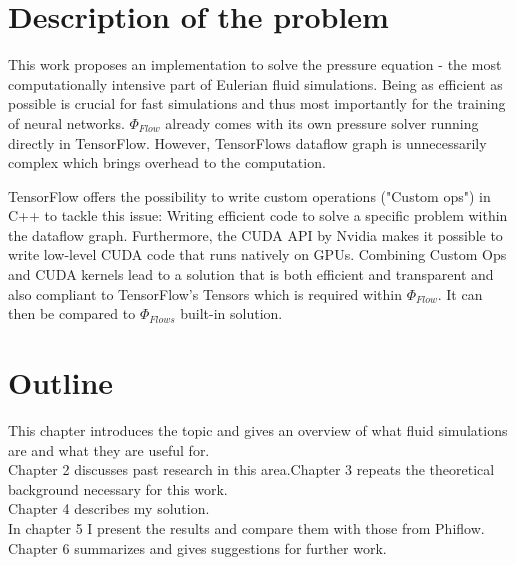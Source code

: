 \section{Description of the problem}
This work proposes an implementation to solve the pressure equation - the most computationally intensive part of Eulerian fluid simulations. Being as efficient as possible is crucial for fast simulations and thus most importantly for the training of neural networks. $\Phi_\textit{Flow}$ already comes with its own pressure solver running directly in TensorFlow. However, TensorFlows dataflow graph is unnecessarily complex which brings overhead to the computation.
\par TensorFlow offers the possibility to write custom operations ("Custom ops") in C++ to tackle this issue: Writing efficient code to solve a specific problem within the dataflow graph. Furthermore, the CUDA API by Nvidia makes it possible to write low-level CUDA code that runs natively on GPUs. Combining Custom Ops and CUDA kernels lead to a solution that is both efficient and transparent and also compliant to TensorFlow's Tensors which is required within $\Phi_\textit{Flow}$. It can then be compared to $\Phi_\textit{Flows}$ built-in solution.
\section{Outline}
This chapter introduces the topic and gives an overview of what fluid simulations are and what they are useful for.\\
Chapter 2 discusses past research in this area.Chapter 3 repeats the theoretical background necessary for this work.\\
Chapter 4 describes my solution.\\
In chapter 5 I present the results and compare them with those from Phiflow.\\
Chapter 6 summarizes and gives suggestions for further work.\\

